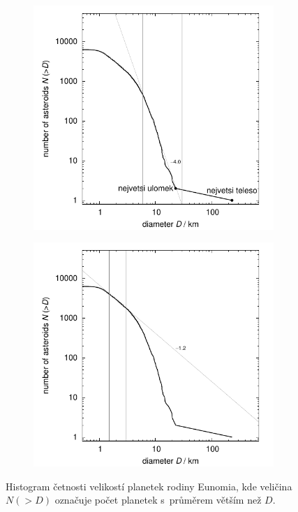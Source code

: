 \documentclass[A4paper, 12pt, oneside]{book}
\begin{document}
\begin{figure}[!htb]
	\centering
	\begin{subfigure}[b]{0.45\textwidth}
	\includegraphics[width=\textwidth]{obr/size_distribution}
	\end{subfigure}
	\begin{subfigure}[b]{0.45\textwidth}
	\includegraphics[width=\textwidth]{obr/size_distribution_SMALLD}
	\end{subfigure}
	\caption{Histogram četnosti velikostí planetek rodiny Eunomia, kde veličina $N({>}D)$ označuje počet planetek s~průměrem větším než $D$.}
	\label{size_distribution}
\end{figure}
\end{document}
